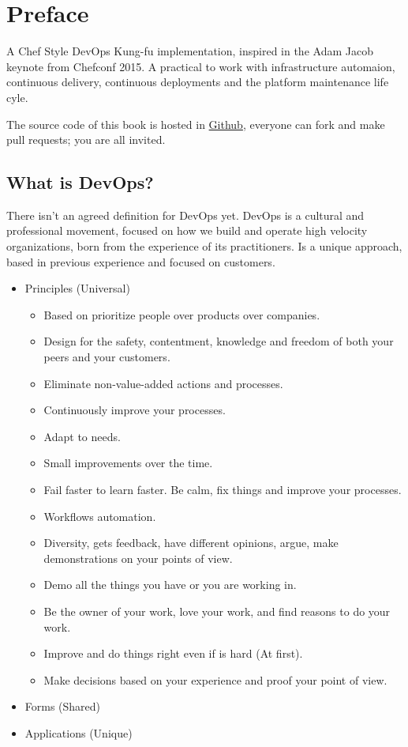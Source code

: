 \chapter{Preface}

A Chef Style DevOps Kung-fu implementation, inspired
in the Adam Jacob keynote from Chefconf 2015. A practical
to work with infrastructure automaion, continuous delivery,
continuous deployments and the platform maintenance life cyle.

The source code of this book is hosted in \href{https://github.com/carlosdcg/chefbyexample_book}{Github},
everyone can fork and make pull requests; you are all invited.

\section{What is DevOps?}

There isn’t an agreed definition for DevOps yet.
DevOps is a cultural and professional movement, focused on
how we build and operate high velocity organizations, born
from the experience of its practitioners. Is a
unique approach, based in previous experience and focused on customers.

\begin{itemize}
\item Principles (Universal)

\begin{itemize}
\item Based on prioritize people over products over companies.
\item Design for the safety, contentment, knowledge and freedom of both your peers and your customers.
\item Eliminate non-value-added actions and processes.
\item Continuously improve your processes.
\item Adapt to needs.
\item Small improvements over the time.
\item Fail faster to learn faster. Be calm, fix things and improve your processes.
\item Workflows automation.
\item Diversity, gets feedback, have different opinions, argue, make demonstrations on your points of view.
\item Demo all the things you have or you are working in.
\item Be the owner of your work, love your work, and find reasons to do your work.
\item Improve and do things right even if is hard (At first).
\item Make decisions based on your experience and proof your point of view.
\end{itemize}
\item Forms (Shared)
\item Applications (Unique)
\end{itemize}

